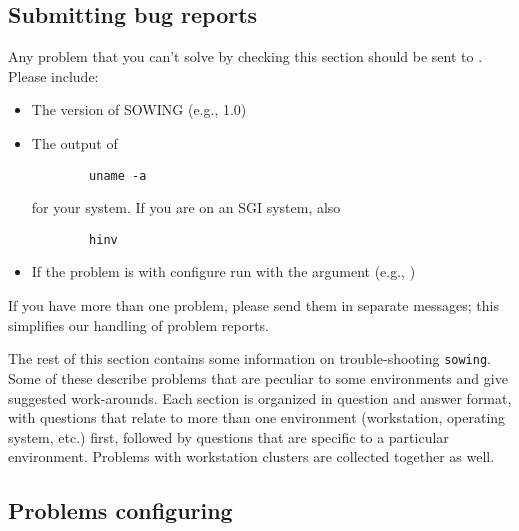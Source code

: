 \documentclass[11pt,twoside]{article}
\newcommand{\sowing}{{\tt sowing}}
\begin{document}
\subsection{Submitting bug reports}
\label{sec:bugreports}
Any problem that you can't solve by checking this section should be sent to
.  
Please include:
\begin{itemize}
\item     The version of SOWING (e.g., 1.0)

\item     The output of 
\begin{verbatim}
        uname -a
\end{verbatim}
     for your system.  If you are on an SGI system, also
\begin{verbatim}
        hinv
\end{verbatim}

\item     If the problem is with configure  run with the  argument 
     (e.g.,  )

\end{itemize}
If you have more than one problem, please
send them in separate messages; this simplifies our handling of problem
reports. 
 
The rest of this  section contains some information on trouble-shooting
\sowing. 
Some of 
these describe problems that are peculiar to some environments and give
suggested work-arounds.
Each section is organized in question and answer format, with questions that
relate to more than one environment (workstation, operating system, etc.)
first, followed by questions that are specific to a particular environment.
Problems with workstation clusters are collected together as well.

\subsection{Problems configuring}
\end{document}
